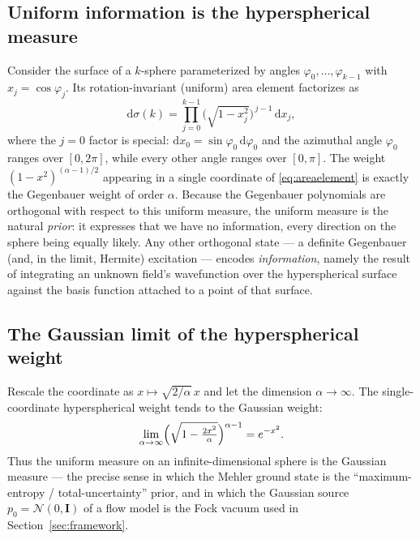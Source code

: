 \documentclass[11pt, a4paper]{article}
\begin{document}
\subsection{Uniform information is the hyperspherical measure}

Consider the surface of a $k$-sphere parameterized by angles
$\varphi_0,\dots,\varphi_{k-1}$ with $x_j=\cos\varphi_j$. Its rotation-invariant
(uniform) area element factorizes as
\begin{equation}
  \mathrm{d}\sigma(k)=\prod_{j=0}^{k-1}
  \bigl(\sqrt{1-x_j^2}\bigr)^{\,j-1}\,\mathrm{d}x_j ,
  \label{eq:areaelement}
\end{equation}
where the $j=0$ factor is special: $\mathrm{d}x_0=\sin\varphi_0\,
\mathrm{d}\varphi_0$ and the azimuthal angle $\varphi_0$ ranges over
$[0,2\pi]$, while every other angle ranges over $[0,\pi]$. The weight
$(1-x^2)^{(\alpha-1)/2}$ appearing in a single coordinate of
\eqref{eq:areaelement} is exactly the Gegenbauer weight of order
$\alpha$. Because the Gegenbauer polynomials are orthogonal with respect to
this uniform measure, the uniform measure is the natural \emph{prior}: it
expresses that we have no information, every direction on the sphere being
equally likely. Any other orthogonal state --- a definite Gegenbauer (and, in
the limit, Hermite) excitation --- encodes \emph{information}, namely the
result of integrating an unknown field's wavefunction over the hyperspherical
surface against the basis function attached to a point of that surface.

\subsection{The Gaussian limit of the hyperspherical weight}

Rescale the coordinate as $x\mapsto\sqrt{2/\alpha}\,x$ and let the dimension
$\alpha\to\infty$. The single-coordinate hyperspherical weight tends to the
Gaussian weight:
\begin{equation}
  \lim_{\alpha\to\infty}\Bigl(\sqrt{1-\tfrac{2x^2}{\alpha}}\Bigr)^{\alpha-1}
  =e^{-x^2}.
  \label{eq:gaussweight}
\end{equation}
Thus the uniform measure on an infinite-dimensional sphere is the Gaussian
measure --- the precise sense in which the Mehler ground state is the
``maximum-entropy / total-uncertainty'' prior, and in which the Gaussian source
$p_0=\mathcal{N}(0,\mathbf I)$ of a flow model is the Fock vacuum used in
Section~\ref{sec:framework}.
\end{document}
